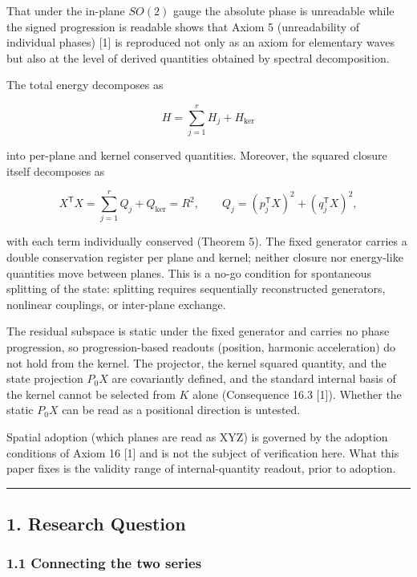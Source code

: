 \documentclass[
  a4paper,
]{article}
\begin{document}
That under the in-plane \(SO(2)\) gauge the absolute phase is unreadable
while the signed progression is readable shows that Axiom 5
(unreadability of individual phases) {[}1{]} is reproduced not only as
an axiom for elementary waves but also at the level of derived
quantities obtained by spectral decomposition.

The total energy decomposes as

\[
H=\sum_{j=1}^{r}H_j+H_{\ker}
\]

into per-plane and kernel conserved quantities. Moreover, the squared
closure itself decomposes as

\[
X^{\mathsf T}X=\sum_{j=1}^{r}Q_j+Q_{\ker}=R^2,
\qquad
Q_j=(p_j^{\mathsf T}X)^2+(q_j^{\mathsf T}X)^2,
\]

with each term individually conserved (Theorem 5). The fixed generator
carries a double conservation register per plane and kernel; neither
closure nor energy-like quantities move between planes. This is a no-go
condition for spontaneous splitting of the state: splitting requires
sequentially reconstructed generators, nonlinear couplings, or
inter-plane exchange.

The residual subspace is static under the fixed generator and carries no
phase progression, so progression-based readouts (position, harmonic
acceleration) do not hold from the kernel. The projector, the kernel
squared quantity, and the state projection \(P_0X\) are covariantly
defined, and the standard internal basis of the kernel cannot be
selected from \(K\) alone (Consequence 16.3 {[}1{]}). Whether the static
\(P_0X\) can be read as a positional direction is untested.

Spatial adoption (which planes are read as XYZ) is governed by the
adoption conditions of Axiom 16 {[}1{]} and is not the subject of
verification here. What this paper fixes is the validity range of
internal-quantity readout, prior to adoption.

\begin{center}\rule{0.5\linewidth}{0.5pt}\end{center}

\subsection{1. Research Question}\label{research-question}

\subsubsection{1.1 Connecting the two
series}\label{connecting-the-two-series}
\end{document}
